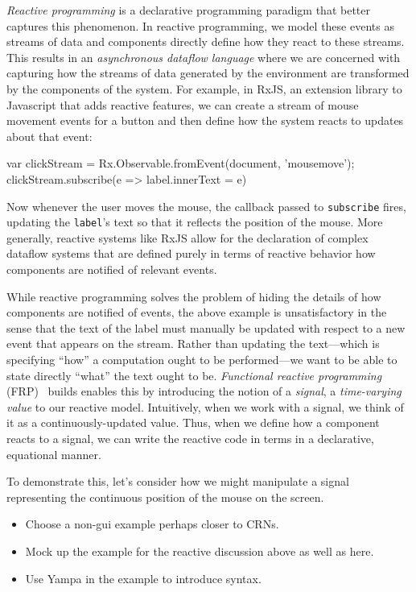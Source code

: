 \emph{Reactive programming} is a declarative programming paradigm that better captures this phenomenon.
In reactive programming, we model these events as streams of data and components directly define how they react to these streams.
This results in an \emph{asynchronous dataflow language} where we are concerned with capturing how the streams of data generated by the environment are transformed by the components of the system.
For example, in RxJS, an extension library to Javascript that adds reactive features, we can create a stream of mouse movement events for a button and then define how the system reacts to updates about that event:
\begin{javascriptcode}
var clickStream = Rx.Observable.fromEvent(document, 'mousemove');
clickStream.subscribe(e => label.innerText = e)
\end{javascriptcode}
Now whenever the user moves the mouse, the callback passed to \verb+subscribe+ fires, updating the \verb+label+'s text so that it reflects the position of the mouse.
More generally, reactive systems like RxJS allow for the declaration of complex dataflow systems that are defined purely in terms of reactive behavior how components are notified of relevant events.

While reactive programming solves the problem of hiding the details of how components are notified of events, the above example is unsatisfactory in the sense that the text of the label must manually be updated with respect to a new event that appears on the stream.
Rather than updating the text---which is specifying ``how'' a computation ought to be performed---we want to be able to state directly ``what'' the text ought to be.
\emph{Functional reactive programming} (FRP)~\cite{elliott1997, czaplicki2013, finkbeiner2019, jeffrey2012} builds enables this by introducing the notion of a \emph{signal}, a \emph{time-varying value} to our reactive model.
Intuitively, when we work with a signal, we think of it as a continuously-updated value.
Thus, when we define how a component reacts to a signal, we can write the reactive code in terms in a declarative, equational manner.

To demonstrate this, let's consider how we might manipulate a signal representing the continuous position of the mouse on the screen.
\begin{itemize}
  \item Choose a non-gui example perhaps closer to CRNs.
  \item Mock up the example for the reactive discussion above as well as here.
  \item Use Yampa in the example to introduce syntax.
\end{itemize}

